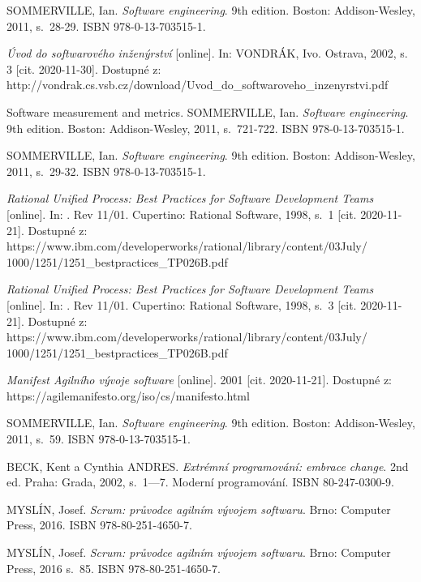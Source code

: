 \documentclass[czech,master,public,dept460,male,cpdeclaration,oneside]{diploma}
\begin{document}
\begin{thebibliography}{41}

SOMMERVILLE, Ian. \textit{Software engineering}. 9th edition. Boston: Addison-Wesley, 2011, s.~28-29. ISBN 978-0-13-703515-1.

\textit{Úvod do softwarového inženýrství} [online]. In: VONDRÁK, Ivo. Ostrava, 2002, s. 3 [cit. 2020-11-30]. Dostupné z: http://vondrak.cs.vsb.cz/download/Uvod\_do\_softwaroveho\_inzenyrstvi.pdf

Software measurement and metrics. SOMMERVILLE, Ian. \textit{Software engineering}. 9th edition. Boston: Addison-Wesley, 2011, s.~721-722. ISBN 978-0-13-703515-1.

SOMMERVILLE, Ian. \textit{Software engineering}. 9th edition. Boston: Addison-Wesley, 2011, s.~29-32. ISBN 978-0-13-703515-1.

\textit{Rational Unified Process: Best Practices for Software Development Teams} [online]. In: . Rev 11/01. Cupertino: Rational Software, 1998, s.~1 [cit. 2020-11-21]. Dostupné z: https://www.ibm.com/developerworks/rational/library/content/03July/
1000/1251/1251\_bestpractices\_TP026B.pdf

\textit{Rational Unified Process: Best Practices for Software Development Teams} [online]. In: . Rev 11/01. Cupertino: Rational Software, 1998, s.~3 [cit. 2020-11-21]. Dostupné z: https://www.ibm.com/developerworks/rational/library/content/03July/
1000/1251/1251\_bestpractices\_TP026B.pdf

\textit{Manifest Agilního vývoje software} [online]. 2001 [cit. 2020-11-21]. Dostupné z: https://agilemanifesto.org/iso/cs/manifesto.html

SOMMERVILLE, Ian. \textit{Software engineering}. 9th edition. Boston: Addison-Wesley, 2011, s.~59. ISBN 978-0-13-703515-1.

BECK, Kent a Cynthia ANDRES. \textit{Extrémní programování: embrace change}. 2nd ed. Praha: Grada, 2002, s.~1---7. Moderní programování. ISBN 80-247-0300-9.

MYSLÍN, Josef. \textit{Scrum: průvodce agilním vývojem softwaru}. Brno: Computer Press, 2016. ISBN 978-80-251-4650-7.

MYSLÍN, Josef. \textit{Scrum: průvodce agilním vývojem softwaru}. Brno: Computer Press, 2016 s.~85. ISBN 978-80-251-4650-7.


\end{thebibliography}
\end{document}
